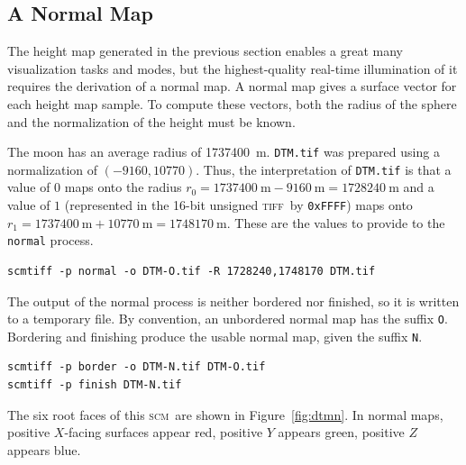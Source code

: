 \documentclass[oneside,10pt]{memoir}
\newcommand{\scm}     {\textsc{scm}}
\newcommand{\tiff}    {\textsc{tiff}}
\begin{document}
\begin{Spacing}{1.1}
\subsection{A Normal Map}
\label{sec:normal}

The height map generated in the previous section enables a great many visualization tasks and modes, but the highest-quality real-time illumination of it requires the derivation of a normal map. A normal map gives a surface vector for each height map sample. To compute these vectors, both the radius of the sphere and the normalization of the height must be known.

The moon has an average radius of \SI{1737400}{\meter}. \texttt{DTM.tif} was prepared using a normalization of $(\num{-9160},\num{10770})$. Thus, the interpretation of \texttt{DTM.tif} is that a value of $0$ maps onto the radius $r_0=\SI{1737400}{\meter}-\SI{9160}{\meter}=\SI{1728240}{\meter}$ and a value of $1$ (represented in the 16-bit unsigned \tiff\ by \texttt{0xFFFF}) maps onto $r_1=\SI{1737400}{\meter}+\SI{10770}{\meter}=\SI{1748170}{\meter}$. These are the values to provide to the \texttt{normal} process.

\begin{Verbatim}
scmtiff -p normal -o DTM-O.tif -R 1728240,1748170 DTM.tif
\end{Verbatim}

The output of the normal process is neither bordered nor finished, so it is written to a temporary file. By convention, an unbordered normal map has the suffix \texttt{O}. Bordering and finishing produce the usable normal map, given the suffix \texttt{N}.

\begin{Verbatim}
scmtiff -p border -o DTM-N.tif DTM-O.tif
scmtiff -p finish DTM-N.tif
\end{Verbatim}

The six root faces of this \scm\ are shown in Figure~\ref{fig:dtmn}. In normal maps, positive $X$-facing surfaces appear red, positive $Y$ appears green, positive $Z$ appears blue.


\end{Spacing}
\end{document}
